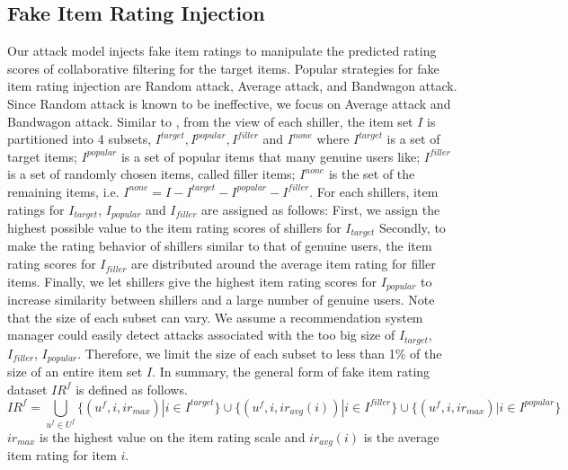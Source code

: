 \documentclass[master,english,final]{kaist-ucs}
\begin{document}
\subsection{Fake Item Rating Injection}
Our attack model injects fake item ratings to manipulate the predicted rating scores of collaborative filtering for the target items.
Popular strategies for fake item rating injection are Random attack, Average attack, and Bandwagon attack.
Since Random attack is known to be ineffective, we focus on Average attack and Bandwagon attack.
Similar to \cite{shilling_attack_guide}, from the view of each shiller, the item set $I$ is partitioned into 4 subsets, $I^{target},I^{popular},I^{filler}$ and $I^{none}$
where $I^{target}$ is a set of target items;
$I^{popular}$ is a set of popular items that many genuine users like;
$I^{filler}$ is a set of randomly chosen items, called filler items;
$I^{none}$ is the set of the remaining items, i.e. $I^{none}=I-I^{target}-I^{popular}-I^{filler}$.
For each shillers, item ratings for $I_{target}$, $I_{popular}$ and $I_{filler}$ are assigned as follows:
First, we assign the highest possible value to the item rating scores of shillers for $I_{target}$
Secondly, to make the rating behavior of shillers similar to that of genuine users, the item rating scores for $I_{filler}$ are distributed around the average item rating for filler items.
Finally, we let shillers give the highest item rating scores for $I_{popular}$ to increase similarity between shillers and a large number of genuine users.
Note that the size of each subset can vary.
We assume a recommendation system manager could easily detect attacks associated with the too big size of $I_{target}$, $I_{filler}$, $I_{popular}$.
Therefore, we limit the size of each subset to less than 1\% of the size of an entire item set $I$.
In summary, the general form of fake item rating dataset $IR^f$ is defined as follows.
\begin{equation}
{IR}^f = \bigcup_{u^f \in U^f} \{(u^f,i,ir_{max}) | i \in I^{target} \} \cup \{(u^f,i,ir_{avg} {(i)}) | i \in I^{filler} \} \cup \{(u^f,i,ir_{max}) | i \in I^{popular} \}
\end{equation}
$ir_{max}$ is the highest value on the item rating scale and $ir_{avg} {(i)}$ is the average item rating for item $i$.
\end{document}
